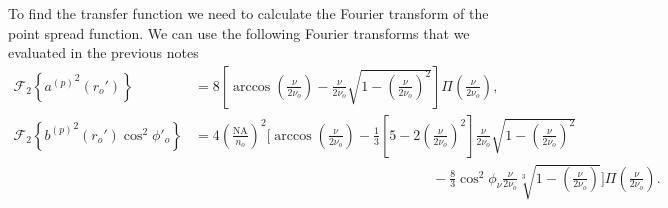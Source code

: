 \documentclass[11pt]{article}
\begin{document}
To find the transfer function we need to calculate the Fourier transform of the
point spread function. We can use the following Fourier transforms that we
evaluated in the previous notes
\begin{align}
\mathcal{F}_2\left\{{a^{(p)}}^2(r_o')\right\} &= 8\left[\arccos\left(\frac{\nu}{2\nu_o}\right) - \frac{\nu}{2\nu_o}\sqrt{1 - \left(\frac{\nu}{2\nu_o}\right)^2}\right]\Pi\left(\frac{\nu}{2\nu_o}\right),\\
\mathcal{F}_2\left\{{b^{(p)}}^2(r_o')\cos^2\phi'_o\right\} &= 4\left(\frac{\text{NA}}{n_o}\right)^2\Bigg[\arccos\left(\frac{\nu}{2\nu_o}\right) - \frac{1}{3}\left[5 - 2\left(\frac{\nu}{2\nu_o}\right)^2\right]\frac{\nu}{2\nu_o} \sqrt{1 - \left(\frac{\nu}{2\nu_o}\right)^2}\nonumber\\ &\hspace{17em} - \frac{8}{3}\cos^2\phi_\nu\frac{\nu}{2\nu_o}\sqrt[3]{1 - \left(\frac{\nu}{2\nu_o}\right)}\Bigg]\Pi\left(\frac{\nu}{2\nu_o}\right).              
\end{align}
\end{document}
